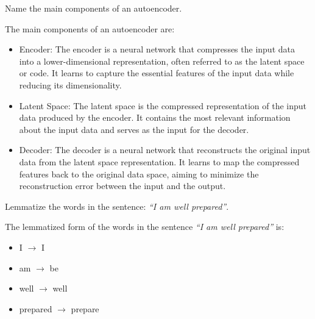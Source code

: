 \documentclass[12pt]{article}
\begin{document}
    \begin{ejercicio}[Autoencoders (1 pt.)]
        Name the main components of an autoencoder.

        The main components of an autoencoder are:
        \begin{itemize}
            \item Encoder: The encoder is a neural network that compresses the input data into a lower-dimensional representation, often referred to as the latent space or code. It learns to capture the essential features of the input data while reducing its dimensionality.
            \item Latent Space: The latent space is the compressed representation of the input data produced by the encoder. It contains the most relevant information about the input data and serves as the input for the decoder.
            \item Decoder: The decoder is a neural network that reconstructs the original input data from the latent space representation. It learns to map the compressed features back to the original data space, aiming to minimize the reconstruction error between the input and the output.
        \end{itemize}
    \end{ejercicio}

    \begin{ejercicio}
        Lemmatize the words in the sentence: \textit{``I am well prepared''}.

        The lemmatized form of the words in the sentence \textit{``I am well prepared''} is:
        \begin{itemize}
            \item I $\rightarrow$ I
            \item am $\rightarrow$ be
            \item well $\rightarrow$ well
            \item prepared $\rightarrow$ prepare
        \end{itemize}
    \end{ejercicio}
\end{document}
